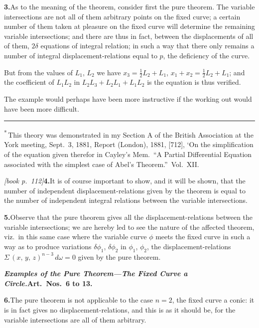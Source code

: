\documentclass[11pt,a4paper]{article}
\theoremstyle{plain}
\theoremstyle{definition}
\theoremstyle{remark}
\begin{document}
\medskip\noindent\textbf{3.}\quad As to the meaning of the theorem, consider first the pure theorem. The variable intersections are not all of them arbitrary points on the fixed curve; a certain number of them taken at pleasure on the fixed curve will determine the remaining variable intersections; and there are thus in fact, between the displacements of all of them, $2\delta$ equations of integral relation; in such a way that there only remains a number of integral displacement-relations equal to $p$, the deficiency of the curve.

But from the values of $L_1$, $L_2$ we have $x_3 = \tfrac{1}{2}L_2 + L_1$, $x_1 + x_2 = \tfrac{1}{2}L_2 + L_1$; and the coefficient of $L_1L_2$ in $L_2L_3 + L_2L_1 + L_1L_2$ is the equation is thus verified.

The example would perhaps have been more instructive if the working out would have been more difficult.

\bigskip

\hrule
\smallskip
\noindent\textsuperscript{*}\,This theory was demonstrated in my Section A of the British Association at the York meeting, Sept.~3, 1881, Report (London), 1881, [712], `On the simplification of the equation given therefor in Cayley's Mem.\ ``A Partial Differential Equation associated with the simplest case of Abel's Theorem.''\ Vol.~XII.\

\noindent\textit{[book p.~112]}\quad \textbf{4.}\quad It is of course important to show, and it will be shown, that the number of independent displacement-relations given by the theorem is equal to the number of independent integral relations between the variable intersections.

\medskip\noindent\textbf{5.}\quad Observe that the pure theorem gives all the displacement-relations between the variable intersections; we are hereby led to see the nature of the affected theorem, viz.\ in this same case where the variable curve $\phi$ meets the fixed curve in such a way as to produce variations $\delta\phi_1$, $\delta\phi_2$ in $\phi_1$, $\phi_2$, the displacement-relations $\Sigma\,(x,\,y,\,z)^{n-3}\,d\omega = 0$ given by the pure theorem.

\medskip\noindent\textbf{\textit{Examples of the Pure Theorem---The Fixed Curve a Circle.}\quad Art.\ Nos.\ 6 to 13.}

\medskip\noindent\textbf{6.}\quad The pure theorem is not applicable to the case $n = 2$, the fixed curve a conic: it is in fact gives no displacement-relations, and this is as it should be, for the variable intersections are all of them arbitrary.
\end{document}
